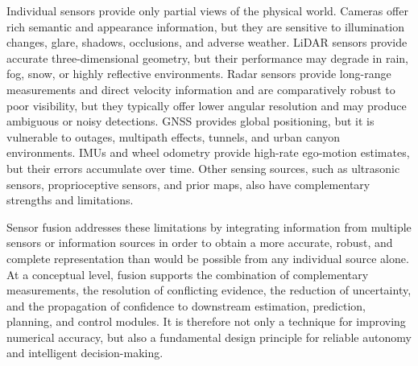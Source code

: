Individual sensors provide only partial views of the physical world. Cameras offer rich semantic and appearance information, but they are sensitive to illumination changes, glare, shadows, occlusions, and adverse weather. LiDAR sensors provide accurate three-dimensional geometry, but their performance may degrade in rain, fog, snow, or highly reflective environments. Radar sensors provide long-range measurements and direct velocity information and are comparatively robust to poor visibility, but they typically offer lower angular resolution and may produce ambiguous or noisy detections. GNSS provides global positioning, but it is vulnerable to outages, multipath effects, tunnels, and urban canyon environments. IMUs and wheel odometry provide high-rate ego-motion estimates, but their errors accumulate over time. Other sensing sources, such as ultrasonic sensors, proprioceptive sensors, and prior maps, also have complementary strengths and limitations.

Sensor fusion addresses these limitations by integrating information from multiple sensors or information sources in order to obtain a more accurate, robust, and complete representation than would be possible from any individual source alone. At a conceptual level, fusion supports the combination of complementary measurements, the resolution of conflicting evidence, the reduction of uncertainty, and the propagation of confidence to downstream estimation, prediction, planning, and control modules. It is therefore not only a technique for improving numerical accuracy, but also a fundamental design principle for reliable autonomy and intelligent decision-making. 

